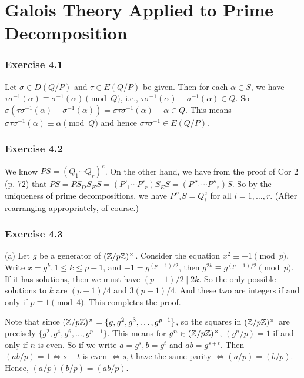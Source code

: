 \documentclass[../Marcus.tex]{subfiles}
\begin{document}
\chapter{Galois Theory Applied to Prime Decomposition}

\subsection*{Exercise 4.1}

Let $\sigma\in D(Q/P)$ and $\tau\in E(Q/P)$ be given. Then for each $\alpha\in S$, we have $\tau\sigma^{-1}(\alpha)\equiv \sigma^{-1}(\alpha) \pmod{Q}$, i.e., $\tau\sigma^{-1}(\alpha)-\sigma^{-1}(\alpha)\in Q$. So $\sigma(\tau\sigma^{-1}(\alpha)-\sigma^{-1}(\alpha))=\sigma\tau\sigma^{-1}(\alpha)-\alpha \in Q$. This means $\sigma\tau\sigma^{-1}(\alpha) \equiv \alpha \pmod{Q}$ and hence $\sigma\tau\sigma^{-1}\in E(Q/P)$.

\subsection*{Exercise 4.2}

We know $PS=(Q_1\cdots Q_r)^e$. On the other hand, we have from the proof of Cor 2 (p. 72) that $PS=PS_DS_ES=(P'_1\cdots P'_r)S_ES=(P''_1\cdots P''_r)S$. So by the uniqueness of prime decompositions, we have $P''_iS=Q_i^e$ for all $i=1,\ldots,r$. (After rearranging appropriately, of course.)

\subsection*{Exercise 4.3}

(a) Let $g$ be a generator of $(\mathbb{Z}/p\mathbb{Z})^\times$. Consider the equation $x^2\equiv -1\pmod{p}$. Write $x=g^k,1\leq k\leq p-1$, and $-1=g^{(p-1)/2}$, then $g^{2k}\equiv g^{(p-1)/2}\pmod{p}$. If it has solutions, then we must have $(p-1)/2\mid 2k$. So the only possible solutions to $k$ are $(p-1)/4$ and $3(p-1)/4$. And these two are integers if and only if $p\equiv 1\pmod{4}$. This completes the proof.

Note that since $(\mathbb{Z}/p\mathbb{Z})^\times=\{g,g^2,g^3,\ldots,g^{p-1}\}$, so the squares in $(\mathbb{Z}/p\mathbb{Z})^\times$ are precisely $\{g^2,g^4,g^6,\ldots,g^{p-1}\}$. This means for $g^n\in(\mathbb{Z}/p\mathbb{Z})^\times$, $(g^n/p)=1$ if and only if $n$ is even. So if we write $a=g^s,b=g^t$ and $ab=g^{s+t}$. Then $(ab/p)=1 \iff s+t$ is even $\iff s,t$ have the same parity $\iff (a/p)=(b/p)$. Hence, $(a/p)(b/p)=(ab/p)$.
\end{document}
